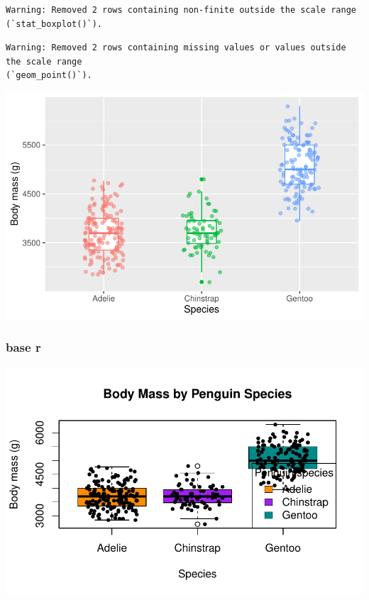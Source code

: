\documentclass[
  letterpaper,
  DIV=11,
  numbers=noendperiod]{scrreprt}
\begin{document}
\begin{verbatim}
Warning: Removed 2 rows containing non-finite outside the scale range
(`stat_boxplot()`).
\end{verbatim}

\begin{verbatim}
Warning: Removed 2 rows containing missing values or values outside the scale range
(`geom_point()`).
\end{verbatim}

\includegraphics{scripts/02_dataViz/class4_files/figure-pdf/unnamed-chunk-5-1.pdf}

\hypertarget{base-r-6}{%
\subsubsection{base r}\label{base-r-6}}

\includegraphics{scripts/02_dataViz/class4_files/figure-pdf/unnamed-chunk-6-1.pdf}
\end{document}

